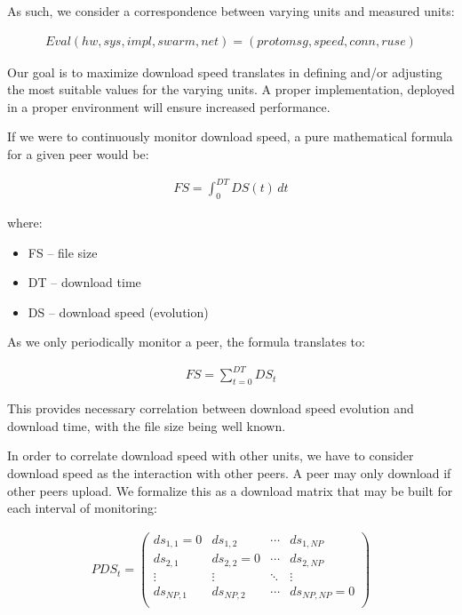 As such, we consider a correspondence between varying units and measured
units:

\begin{align}
\label{eq:proto-measure:eval}
Eval(hw, sys, impl, swarm, net) = (protomsg, speed, conn, ruse)
\end{align}

Our goal is to maximize download speed translates in defining and/or adjusting
the most suitable values for the varying units. A proper implementation,
deployed in a proper environment will ensure increased performance.

If we were to continuously monitor download speed, a pure mathematical formula
for a given peer would be:

\begin{align}
  FS = \int_0^{DT} DS(t)\,dt
\end{align}

where:

\begin{itemize}
  \item FS -- file size
  \item DT -- download time
  \item DS -- download speed (evolution)
\end{itemize}

As we only periodically monitor a peer, the formula translates to:

\begin{align}
  FS = \sum_{t=0}^{DT} DS_{t}
\end{align}

This provides necessary correlation between download speed evolution and
download time, with the file size being well known.

In order to correlate download speed with other units, we have to consider
download speed as the interaction with other peers. A peer may only download
if other peers upload. We formalize this as a download matrix that may
be built for each interval of monitoring:

\begin{align}
  PDS_{t} =
  \begin{pmatrix}
    ds_{1,1} = 0 & ds_{1,2} & \cdots & ds_{1,NP} \\
    ds_{2,1} & ds_{2,2} = 0 & \cdots & ds_{2,NP} \\
    \vdots & \vdots & \ddots & \vdots \\
    ds_{NP,1} & ds_{NP,2} & \cdots & ds_{NP,NP} = 0 \\
  \end{pmatrix}
\end{align}

